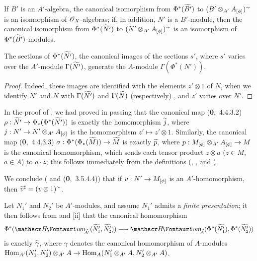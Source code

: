 If $B'$ is an $A'$-algebra, the canonical isomorphism from $\Phi^*({\widetilde{B'}})$ to $(B'\otimes_{A'}A_{[\phi]})^\sim$ is an isomorphism of $\mathscr{O}_X$-algebras;
if, in addition, $N'$ is a $B'$-module, then the canonical isomorphism from $\Phi^*({\widetilde{N'}})$ to $(N'\otimes_{A'}A_{[\phi]})^\sim$ is an isomorphism of $\Phi^*({\widetilde{B'}})$-modules.

\begin{cor}[1.6.6]
\label{1.1.6.6}
The sections of $\Phi^*({\widetilde{N'}})$, the canonical images of the sections $s'$, where $s'$ varies over the $A'$-module $\Gamma({\widetilde{N'}})$, generate the $A$-module $\Gamma(\Phi^*(N'))$.
\end{cor}

\begin{proof}
\label{proof-1.1.6.6}
Indeed, these images are identified with the elements $z'\otimes 1$ of $N$, when we identify $N'$ and $N$ with $\Gamma({\widetilde{N'}})$ and $\Gamma({\widetilde{N}})$ (respectively) , and $z'$ varies over $N'$.
\end{proof}

\begin{env}[1.6.7]
\label{1.1.6.7}
In the proof of , we had proved in passing that the canonical map (\textbf{0},~4.4.3.2) $\rho:\wt{N'}\to\Phi_*(\Phi^*(\wt{N'}))$ is exactly the homomorphism ${\widetilde{j}}$,
where $j:N'\to N'\otimes_{A'}A_{[\vphi]}$ is the homomorphism $z'\mapsto z'\otimes 1$.
Similarly, the canonical map (\textbf{0},~4.4.3.3) $\sigma:\Phi^*(\Phi_*(\wt{M}))\to\wt{M}$ is exactly ${\widetilde{p}}$, where $p:M_{[\vphi]}\otimes_{A'}A_{[\vphi]}\to M$ is the canonical homomorphism, which sends each tensor product $z\otimes a$ ($z\in M$, $a\in A$) to $a\cdot z$;
this follows immediately from the definitions (, , and ).

We conclude ( and (\textbf{0},~3.5.4.4)) that if $v:N'\to M_{[\vphi]}$ is an $A'$-homomorphism, then ${\widetilde{v}}^\sharp=(v\otimes 1)^\sim$.
\end{env}

\begin{env}[1.6.8]
\label{1.1.6.8}
Let $N_1'$ and $N_2'$ be $A'$-modules, and assume $N_1'$ admits a \emph{finite presentation};
it then follows from  and [ii] that the
canonical homomorphism 
\[
  \Phi^*(\shHom_\wt{A'}(\wt{N_1'},\wt{N_2'}))
  \to\shHom_\wt{A}(\Phi^*(\wt{N_1'}),\Phi^*(\wt{N_2'}))
\]
is exactly ${\widetilde{\gamma}}$, where $\gamma$ denotes the canonical homomorphism of $A$-modules $\Hom_{A'}(N_1',N_2')\otimes_{A'}A\to\Hom_A(N_1'\otimes_{A'}A,N_2'\otimes_{A'}A)$.
\end{env}


